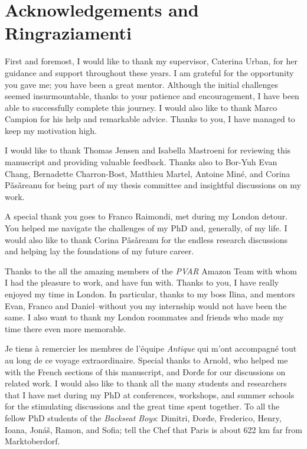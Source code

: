 \chapter*{Acknowledgements and Ringraziamenti}


First and foremost, I would like to thank my supervisor, Caterina Urban, for her guidance and support throughout these years. I am grateful for the opportunity you gave me; you have been a great mentor.
Although the initial challenges seemed insurmountable, thanks to your patience and encouragement,
I have been able to successfully complete this journey.
I would also like to thank Marco Campion for his help and remarkable advice. Thanks to you, I have managed to keep my motivation high.

I would like to thank Thomas Jensen and Isabella Mastroeni for reviewing this manuscript and providing valuable feedback. Thanks also to Bor-Yuh Evan Chang, Bernadette Charron-Bost, Matthieu Martel, Antoine Miné, and Corina Pǎsǎreanu for being part of my thesis committee and insightful discussions on my work.

A special thank you goes to Franco Raimondi, met during my London detour. You helped me navigate the challenges of my PhD and, generally, of my life.
I would also like to thank Corina Pǎsǎreanu for the endless research discussions and helping lay the foundations of my future career.

Thanks to the all the amazing members of the \emph{PVAR} Amazon Team with whom I had the pleasure to work, and have fun with.
Thanks to you, I have really enjoyed my time in London.
In particular, thanks to my boss Ilina, and mentors Evan, Franco and Daniel--without you my internship would not have been the same. I also want to thank my London roommates and friends who made my time there even more memorable.

Je tiens à remercier les membres de l'équipe \emph{Antique} qui m'ont accompagné tout au long de ce voyage extraordinaire. Special thanks to Arnold, who helped me with the French sections of this manuscript, and Đorđe for our discussions on related work. I would also like to thank all the many students and researchers that I have met during my PhD at conferences, workshops, and summer schools for the stimulating discussions and the great time spent together. To all the fellow PhD students of the \emph{Backseat Boys}:
Dimitri,
Đorđe,
Frederico,
Henry,
Ioana,
Jonáš,
Ramon, and
Sofia; tell the Chef that Paris is about 622 km far from Marktoberdorf.

